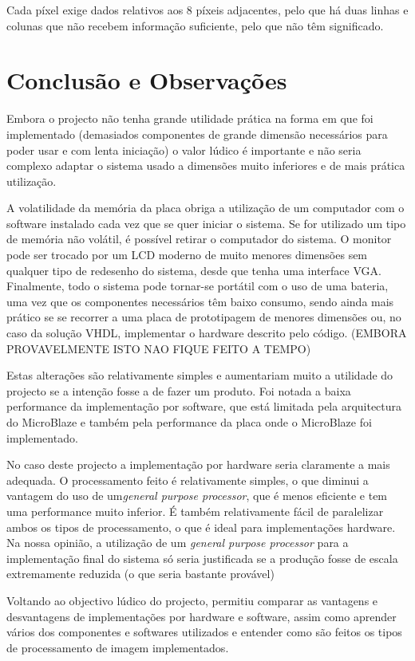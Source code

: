 \documentclass[a4paper]{article}
\begin{document}
Cada píxel exige dados relativos aos 8 píxeis adjacentes, pelo que há duas linhas e colunas que não recebem informação suficiente, pelo que não têm significado.





\section{Conclusão e Observações}
Embora o projecto não tenha grande utilidade prática na forma em que foi implementado (demasiados componentes de grande dimensão necessários para poder usar e com lenta iniciação) o valor lúdico é importante e não seria complexo adaptar o sistema usado a dimensões muito inferiores e de mais prática utilização. 

A volatilidade da memória da placa obriga a utilização de um computador com o software instalado cada vez que se quer iniciar o sistema. Se for utilizado um tipo de memória não volátil, é possível retirar o computador do sistema. O monitor pode ser trocado por um LCD moderno de muito menores dimensões sem qualquer tipo de redesenho do sistema, desde que tenha uma interface VGA. Finalmente, todo o sistema pode tornar-se portátil com o uso de uma bateria, uma vez que os componentes necessários têm baixo consumo, sendo ainda mais prático se se recorrer a uma placa de prototipagem de menores dimensões ou, no caso da solução VHDL, implementar o hardware descrito pelo código. (EMBORA PROVAVELMENTE ISTO NAO FIQUE FEITO A TEMPO)

Estas alterações são relativamente simples e aumentariam muito a utilidade do projecto se a intenção fosse a de fazer um produto. 
Foi notada a baixa performance da implementação por software, que está limitada pela arquitectura do MicroBlaze e também pela performance da placa onde o MicroBlaze foi implementado. 

No caso deste projecto a implementação por hardware seria claramente a mais adequada. O processamento feito é relativamente simples, o que diminui a vantagem do uso de um\textit{general purpose processor}, que é menos eficiente e tem uma performance muito inferior. É também relativamente fácil de paralelizar ambos os tipos de processamento, o que é ideal para implementações hardware. Na nossa opinião, a utilização de um \textit{general purpose processor} para a implementação final do sistema só seria justificada se a produção fosse de escala extremamente reduzida (o que seria bastante provável)

Voltando ao objectivo lúdico do projecto, permitiu comparar as vantagens e desvantagens de implementações por hardware e software, assim como aprender vários dos componentes e softwares utilizados e entender como são feitos os tipos de processamento de imagem implementados.






\nocite{labsECom}
\end{document}
